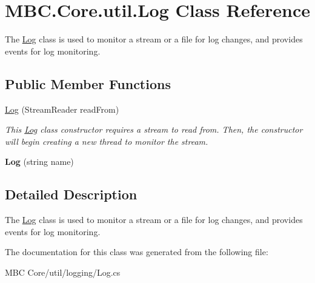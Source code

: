\hypertarget{class_m_b_c_1_1_core_1_1util_1_1_log}{\section{M\-B\-C.\-Core.\-util.\-Log Class Reference}
\label{class_m_b_c_1_1_core_1_1util_1_1_log}
}


The \hyperlink{class_m_b_c_1_1_core_1_1util_1_1_log}{Log} class is used to monitor a stream or a file for log changes, and provides events for log monitoring. 


\subsection*{Public Member Functions}
\begin{DoxyCompactItemize}
\item 
\hypertarget{class_m_b_c_1_1_core_1_1util_1_1_log_a2cd8fbd24c6339b8d9c4855476dc29a1}{\hyperlink{class_m_b_c_1_1_core_1_1util_1_1_log_a2cd8fbd24c6339b8d9c4855476dc29a1}{Log} (Stream\-Reader read\-From)}\label{class_m_b_c_1_1_core_1_1util_1_1_log_a2cd8fbd24c6339b8d9c4855476dc29a1}

\begin{DoxyCompactList}\small\item\em This \hyperlink{class_m_b_c_1_1_core_1_1util_1_1_log}{Log} class constructor requires a stream to read from. Then, the constructor will begin creating a new thread to monitor the stream.\end{DoxyCompactList}\item 
\hypertarget{class_m_b_c_1_1_core_1_1util_1_1_log_adea40d75bea8396044ab77b8f950d81d}{{\bfseries Log} (string name)}\label{class_m_b_c_1_1_core_1_1util_1_1_log_adea40d75bea8396044ab77b8f950d81d}

\end{DoxyCompactItemize}


\subsection{Detailed Description}
The \hyperlink{class_m_b_c_1_1_core_1_1util_1_1_log}{Log} class is used to monitor a stream or a file for log changes, and provides events for log monitoring.

The documentation for this class was generated from the following file\-:\begin{DoxyCompactItemize}
\item 
M\-B\-C Core/util/logging/Log.\-cs\end{DoxyCompactItemize}
